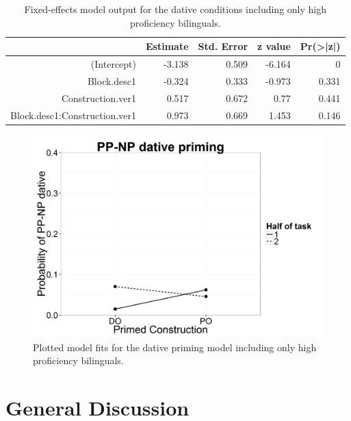 \begin{table}[htbp]
  \centering
  \caption{Fixed-effects model output for the dative conditions including only high proficiency bilinguals.}
    \begin{tabular}{rrrrr}
    \toprule
          & Estimate & Std. Error & z value & Pr(>|z|) \\
    \midrule
    (Intercept) & -3.138 & 0.509 & -6.164 & 0 \\
    Block.desc1 & -0.324 & 0.333 & -0.973 & 0.331 \\
    Construction.ver1 & 0.517 & 0.672 & 0.77  & 0.441 \\
    Block.desc1:Construction.ver1 & 0.973 & 0.669 & 1.453 & 0.146 \\
    \bottomrule
    \end{tabular}%
  \label{tab:priming.fixef.dat.hp}%
\end{table}%

\begin{figure}[htbp]
\centering
\includegraphics[width=\textwidth,height=\textheight,keepaspectratio]{dat_1.png}
\caption{Plotted model fits for the dative priming model including only high proficiency bilinguals. }
\label{fig:priming.fixef.dat.hp}
\end{figure}

\section{General Discussion}
\label{generaldiscussion}

